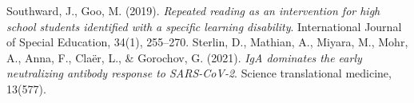 \documentclass{homework}
\begin{document}






\begin{thebibliography}{9}

Southward, J., Goo, M. (2019). \textit{Repeated reading as an intervention for high school students identified with a specific learning disability}. International Journal of Special Education, 34(1), 255–270.
Sterlin, D., Mathian, A., Miyara, M., Mohr, A., Anna, F., Claër, L., \& Gorochov, G. (2021). \textit{IgA dominates the early neutralizing antibody response to SARS-CoV-2}. Science translational medicine, 13(577).
\end{thebibliography}

% 
% 
\end{document}
